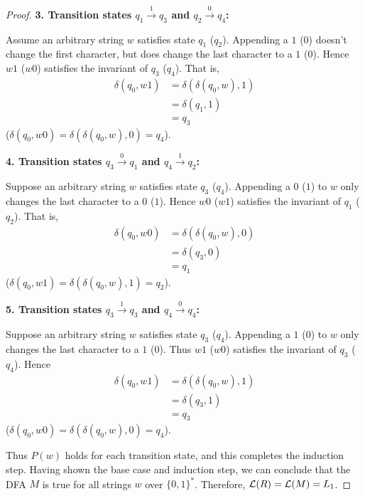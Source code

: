 \begin{proof}
        \newpage
        
        \textbf{3. Transition states $q_1 \xrightarrow{1} q_3$ and $q_2 \xrightarrow{0} q_4$:}
        
        Assume an arbitrary string $w$ satisfies state $q_1$ ($q_2$). Appending a
        $1$ ($0$) doesn't change the first character, but does change the last 
        character to a $1$ ($0$). Hence $w1$ ($w0$) satisfies the invariant of 
        $q_3$ ($q_4$). That is,
        \begin{align*}
            \delta(q_0, w1) &= \delta(\delta(q_0, w), 1) \\
            &= \delta(q_1, 1) \tag{by assumption} \\
            &= q_3
        \end{align*}
        ($\delta(q_0, w0) = \delta(\delta(q_0, w), 0) = q_4$).
        
        \vspace{5mm}
        
        \textbf{4. Transition states $q_3 \xrightarrow{0} q_1$ and $q_4 \xrightarrow{1} q_2$:}
        
        Suppose an arbitrary string $w$ satisfies state $q_3$ ($q_4$). Appending a 
        $0$ ($1$) to $w$ only changes the last character to a $0$ ($1$). Hence
        $w0$ ($w1$) satisfies the invariant of $q_1$ ($q_2$). That is,
        \begin{align*}
            \delta(q_0, w0) &= \delta(\delta(q_0, w), 0) \\
            &= \delta(q_3, 0) \tag{by assumption} \\
            &= q_1
        \end{align*}
        ($\delta(q_0, w1) = \delta(\delta(q_0, w), 1) = q_2$).
        
        \vspace{5mm}
        
        \textbf{5. Transition states $q_3 \xrightarrow{1} q_3$ and $q_4 \xrightarrow{0} q_4$:}
        
        Suppose an arbitrary string $w$ satisfies state $q_3$ ($q_4$). Appending 
        a $1$ ($0$) to $w$ only changes the last character to a $1$ ($0$). Thus
        $w1$ ($w0$) satisfies the invariant of $q_3$ ($q_4$). Hence
        \begin{align*}
            \delta(q_0, w1) &= \delta(\delta(q_0, w), 1) \\
            &= \delta(q_3, 1) \tag{by assumption} \\
            &= q_3
        \end{align*}
        ($\delta(q_0, w0) = \delta(\delta(q_0, w), 0) = q_4$).
        
        \vspace{5mm}
        
        Thus $P(w)$ holds for each transition state, and this completes the
        induction step. Having shown the base case and induction step, we 
        can conclude that the DFA $M$ is true for all strings $w$ over 
        $\{ 0, 1 \}^*$. Therefore, $\mathcal{L}(R) = \mathcal{L}(M) = L_1$.
    \end{proof}
	
